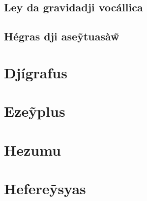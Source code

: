 \documentclass[12pt, a5paper, titlepage]{article}
\begin{document}
\begin{bilingualpages}
    \subsection{Ley da gravidadji vocállica}
    \subsection{Hégras dji ase\~ytuasà\~w}

    \section{Djígrafus}

    \BrTableDigraphs

    \section{Eze\~yplus}

\end{bilingualpages}

\newpage
\section{Hezumu}

\newpage
\section{Hefere\~ysyas}
\end{document}
